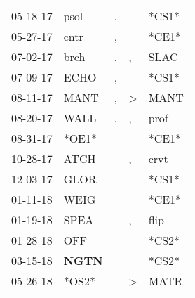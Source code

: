 \begin{supertabular}{p{0.07\textwidth}p{0.06\textwidth}p{0.02\textwidth}p{0.02\textwidth}p{0.06\textwidth}}
          05-18-17\textsuperscript{} &           psol\textsuperscript{} &                , &                  &                            *CS1* \\
          05-27-17\textsuperscript{} &           cntr\textsuperscript{} &                , &                  &                            *CE1* \\
          07-02-17\textsuperscript{} &           brch\textsuperscript{} &                , &                , &           SLAC\textsuperscript{} \\
          07-09-17\textsuperscript{} &           ECHO\textsuperscript{} &                , &                  &                            *CS1* \\
          08-11-17\textsuperscript{} &           MANT\textsuperscript{} &                , &     \textgreater &           MANT\textsuperscript{} \\
          08-20-17\textsuperscript{} &           WALL\textsuperscript{} &                , &                , &           prof\textsuperscript{} \\
          08-31-17\textsuperscript{} &                            *OE1* &                  &                  &                            *CE1* \\
          10-28-17\textsuperscript{} &           ATCH\textsuperscript{} &                  &                , &           crvt\textsuperscript{} \\
          12-03-17\textsuperscript{} &           GLOR\textsuperscript{} &                  &                  &                            *CS1* \\
          01-11-18\textsuperscript{} &           WEIG\textsuperscript{} &                  &                  &                            *CE1* \\
          01-19-18\textsuperscript{} &           SPEA\textsuperscript{} &                  &                , &           flip\textsuperscript{} \\
          01-28-18\textsuperscript{} &            OFF\textsuperscript{} &                  &                  &                            *CS2* \\
          03-15-18\textsuperscript{} &  \textbf{NGTN\textsuperscript{}} &                  &                  &                            *CS2* \\
          05-26-18\textsuperscript{} &                            *OS2* &                  &     \textgreater &           MATR\textsuperscript{} \\

\end{supertabular}
